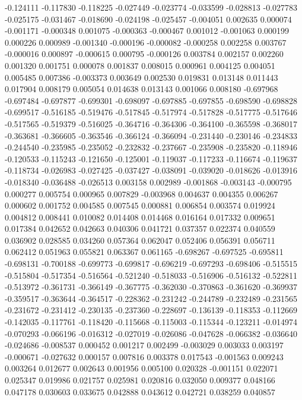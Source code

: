 -0.124111
-0.117830
-0.118225
-0.027449
-0.023774
-0.033599
-0.028813
-0.027783
-0.025175
-0.031467
-0.018690
-0.024198
-0.025457
-0.004051
0.002635
0.000074
-0.001171
-0.000348
0.001075
-0.000363
-0.000467
0.001012
-0.001063
0.000199
0.000226
0.000989
-0.001340
-0.000196
-0.000082
-0.000258
0.002258
0.003767
-0.000016
0.000897
-0.000615
0.000795
-0.000126
0.003784
0.002157
0.002260
0.001320
0.001751
0.000078
0.001837
0.008015
0.000961
0.004125
0.004051
0.005485
0.007386
-0.003373
0.003649
0.002530
0.019831
0.013148
0.011443
0.017904
0.008179
0.005054
0.014638
0.013143
0.001066
0.008180
-0.697968
-0.697484
-0.697877
-0.699301
-0.698097
-0.697885
-0.697855
-0.698590
-0.698828
-0.699517
-0.516185
-0.519476
-0.517845
-0.517974
-0.517828
-0.517775
-0.517646
-0.517565
-0.519379
-0.516025
-0.364716
-0.364306
-0.364100
-0.365598
-0.368017
-0.363681
-0.366605
-0.363546
-0.366124
-0.366094
-0.231440
-0.230146
-0.234833
-0.244540
-0.235985
-0.235052
-0.232832
-0.237667
-0.235908
-0.235820
-0.118946
-0.120533
-0.115243
-0.121650
-0.125001
-0.119037
-0.117233
-0.116674
-0.119637
-0.118734
-0.026983
-0.027425
-0.037427
-0.038091
-0.039020
-0.018626
-0.013916
-0.018340
-0.036488
-0.026513
0.003158
0.002989
-0.001868
-0.003143
-0.000795
0.000277
0.005754
0.000965
0.007829
-0.003968
0.004637
0.004355
0.006267
0.000602
0.001752
0.004585
0.007545
0.000881
0.006854
0.003574
0.019924
0.004812
0.008441
0.010082
0.014408
0.014468
0.016164
0.017332
0.009651
0.017384
0.042652
0.042663
0.040306
0.041721
0.037357
0.022374
0.040559
0.036902
0.028585
0.034260
0.057364
0.062047
0.052406
0.056391
0.056711
0.062412
0.051963
0.055821
0.063367
0.061165
-0.698267
-0.697525
-0.695811
-0.698131
-0.700188
-0.699773
-0.699817
-0.696219
-0.697293
-0.698406
-0.515515
-0.515804
-0.517354
-0.516564
-0.521240
-0.518033
-0.516906
-0.516132
-0.522811
-0.513972
-0.361731
-0.366149
-0.367775
-0.362030
-0.370863
-0.361620
-0.369937
-0.359517
-0.363644
-0.364517
-0.228362
-0.231242
-0.244789
-0.232489
-0.231565
-0.231672
-0.231412
-0.230135
-0.237360
-0.228697
-0.136139
-0.118353
-0.112669
-0.142035
-0.117761
-0.118420
-0.115668
-0.115003
-0.115344
-0.123211
-0.014974
-0.070293
-0.066196
-0.016312
-0.027019
-0.026086
-0.047628
-0.066382
-0.036640
-0.024686
-0.008537
0.000452
0.001217
0.002499
-0.003029
0.003033
0.003197
-0.000671
-0.027632
0.000157
0.007816
0.003378
0.017543
-0.001563
0.009243
0.003264
0.012677
0.002643
0.001956
0.005100
0.020328
-0.001151
0.022071
0.025347
0.019986
0.021757
0.025981
0.020816
0.032050
0.009377
0.048166
0.047178
0.030603
0.033675
0.042888
0.043612
0.042721
0.038259
0.040857
